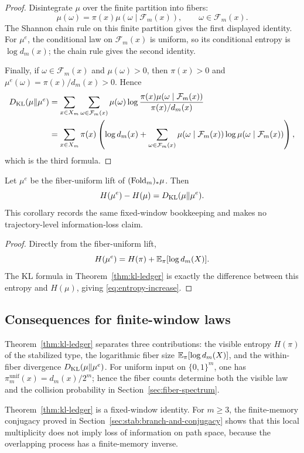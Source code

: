 \begin{proof}
Disintegrate $\mu$ over the finite partition into fibers:
\[
\mu(\omega)=\pi(x)\mu(\omega\mid\mathcal F_m(x)),
\qquad \omega\in\mathcal F_m(x).
\]
The Shannon chain rule on this finite partition gives the first displayed
identity.  For $\mu^e$, the conditional law on $\mathcal F_m(x)$ is uniform,
so its conditional entropy is $\log d_m(x)$; the chain rule gives the second
identity.

Finally, if $\omega\in\mathcal F_m(x)$ and $\mu(\omega)>0$, then
$\pi(x)>0$ and $\mu^e(\omega)=\pi(x)/d_m(x)>0$.  Hence
\[
\begin{aligned}
D_{\mathrm{KL}}(\mu\|\mu^e)
&=\sum_{x\in X_m}\sum_{\omega\in\mathcal F_m(x)}
\mu(\omega)\log
\frac{\pi(x)\mu(\omega\mid\mathcal F_m(x))}{\pi(x)/d_m(x)}\\
&=\sum_{x\in X_m}\pi(x)
\left(
\log d_m(x)+
\sum_{\omega\in\mathcal F_m(x)}
\mu(\omega\mid\mathcal F_m(x))
\log\mu(\omega\mid\mathcal F_m(x))
\right),
\end{aligned}
\]
which is the third formula.
\end{proof}

\begin{corollary}\label{cor:entropy-increase}
Let $\mu^e$ be the fiber-uniform lift of $(\mathrm{Fold}_m)_*\mu$. Then
\begin{equation}\label{eq:entropy-increase}
H(\mu^e)-H(\mu)=D_{\mathrm{KL}}(\mu\|\mu^e).
\end{equation}
This corollary records the same fixed-window bookkeeping and makes no
trajectory-level information-loss claim.
\end{corollary}

\begin{proof}
Directly from the fiber-uniform lift,
\[
H(\mu^e)=H(\pi)+\mathbb{E}_\pi[\log d_m(X)].
\]
The KL formula in Theorem~\ref{thm:kl-ledger} is exactly the difference
between this entropy and $H(\mu)$, giving \eqref{eq:entropy-increase}.
\end{proof}

\subsection{Consequences for finite-window laws}\label{sec:entropy-ledger:consequences}

\begin{remark}
Theorem~\ref{thm:kl-ledger} separates three contributions: the visible
entropy $H(\pi)$ of the stabilized type, the logarithmic fiber size
$\mathbb{E}_\pi[\log d_m(X)]$, and the within-fiber divergence
$D_{\mathrm{KL}}(\mu\|\mu^e)$. For uniform input on $\{0,1\}^m$, one has
$\pi_m^{\mathrm{unif}}(x)=d_m(x)/2^m$; hence the fiber counts determine both
the visible law and the collision probability in Section~\ref{sec:fiber-spectrum}.
\end{remark}

\begin{remark}
Theorem~\ref{thm:kl-ledger} is a fixed-window identity. For $m\ge3$, the
finite-memory conjugacy proved in Section~\ref{sec:stab:branch-and-conjugacy}
shows that this local multiplicity does not imply loss of information on path
space, because the overlapping process has a finite-memory inverse.
\end{remark}
